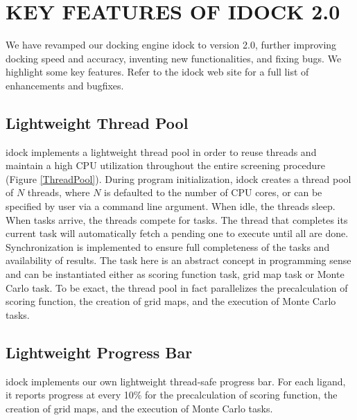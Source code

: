 \documentclass[12pt]{article}
\begin{document}
\section*{\sffamily \Large KEY FEATURES OF IDOCK 2.0}

We have revamped our docking engine idock to version 2.0, further improving docking speed and accuracy, inventing new functionalities, and fixing bugs. We highlight some key features. Refer to the idock web site for a full list of enhancements and bugfixes.

\subsection*{\sffamily \large Lightweight Thread Pool}

idock implements a lightweight thread pool in order to reuse threads and maintain a high CPU utilization throughout the entire screening procedure (Figure \ref{ThreadPool}). During program initialization, idock creates a thread pool of $N$ threads, where $N$ is defaulted to the number of CPU cores, or can be specified by user via a command line argument. When idle, the threads sleep. When tasks arrive, the threads compete for tasks. The thread that completes its current task will automatically fetch a pending one to execute until all are done. Synchronization is implemented to ensure full completeness of the tasks and availability of results. The task here is an abstract concept in programming sense and can be instantiated either as scoring function task, grid map task or Monte Carlo task. To be exact, the thread pool in fact parallelizes the precalculation of scoring function, the creation of grid maps, and the execution of Monte Carlo tasks.

\subsection*{\sffamily \large Lightweight Progress Bar}

idock implements our own lightweight thread-safe progress bar. For each ligand, it reports progress at every 10\% for the precalculation of scoring function, the creation of grid maps, and the execution of Monte Carlo tasks.

\end{document}
